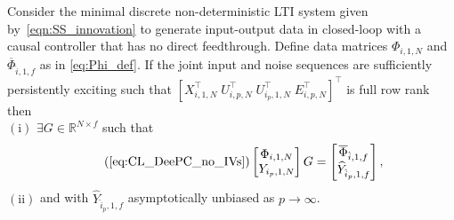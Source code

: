 \begin{thm}\label{theorem:main_result}
    Consider the minimal discrete non-deterministic \ac{LTI} system given by~\eqref{eqn:SS_innovation} to generate input-output data in closed-loop with a causal controller that has no direct feedthrough. Define data matrices $\Phi_{i,1,N}$ and $\overline{\Phi}_{\hat{i},1,f}$ as in \eqref{eq:Phi_def}. %
    If the joint input and noise sequences are sufficiently persistently exciting such that $\left[X_{i,1,N}^\top \; U_{i,p,N}^\top \; U_{i_p,1,N}^\top \; E_{i,p,N}^\top\right]^\top$ is full row rank %
    then \\
    $\mathrm{(i)}$ $\exists G\in\mathbb{R}^{N\times f}$ such that
    \begin{align}\tag{\ref{eq:CL_DeePC_no_IVs}}%
        \begin{bmatrix}
            \Phi_{i,1,N}\\Y_{i_p,1,N}
        \end{bmatrix}G =
        \begin{bmatrix}
            \overline{\Phi}_{\hat{i},1,f}\\\widehat{Y}_{\hat{i}_p,1,f}
        \end{bmatrix},
    \end{align}
    $\mathrm{(ii)}$ and with $\widehat{Y}_{\hat{i}_p,1,f}$ asymptotically unbiased as $p\rightarrow\infty$.
\end{thm}

